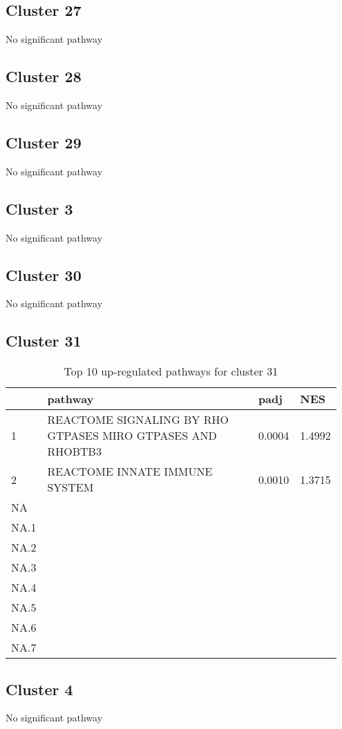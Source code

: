 \documentclass{article}
\begin{document}
\subsection{Cluster 27 }
No significant pathway
\subsection{Cluster 28 }
No significant pathway
\subsection{Cluster 29 }
No significant pathway
\subsection{Cluster 3 }
No significant pathway
\subsection{Cluster 30 }
No significant pathway
\subsection{Cluster 31 }
\begin{table}[H]
\centering
\begin{tabular}{p{0.05\linewidth}p{0.7\linewidth}p{0.1\linewidth}p{0.1\linewidth}}
  \hline
 & pathway & padj & NES \\ 
  \hline
1 & REACTOME SIGNALING BY RHO GTPASES MIRO GTPASES AND RHOBTB3 & 0.0004 & 1.4992 \\ 
  2 & REACTOME INNATE IMMUNE SYSTEM & 0.0010 & 1.3715 \\ 
  NA &  &  &  \\ 
  NA.1 &  &  &  \\ 
  NA.2 &  &  &  \\ 
  NA.3 &  &  &  \\ 
  NA.4 &  &  &  \\ 
  NA.5 &  &  &  \\ 
  NA.6 &  &  &  \\ 
  NA.7 &  &  &  \\ 
   \hline
\end{tabular}
\caption{Top 10 up-regulated pathways for cluster 31} 
\label{tab:q3_2_31}
\end{table}
\subsection{Cluster 4 }
No significant pathway
\end{document}
